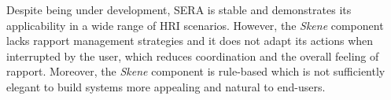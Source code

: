 Despite being under development, \ac{SERA} is stable and demonstrates its applicability in a wide range of \ac{HRI} scenarios. However, the \textit{Skene} component lacks rapport management strategies and it does not adapt its actions when interrupted by the user, which reduces coordination and the overall feeling of rapport. Moreover, the \textit{Skene} component is rule-based which is not sufficiently elegant to build systems more appealing and natural to end-users.